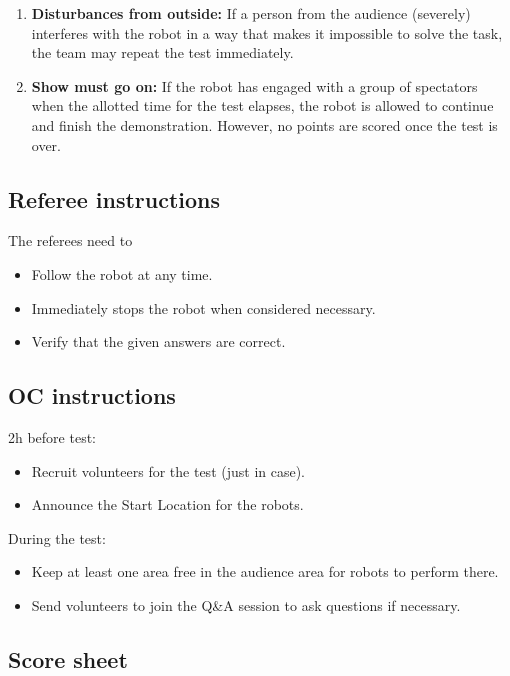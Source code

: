 \begin{enumerate}
	\item \textbf{Disturbances from outside:} If a person from the audience (severely) interferes with the robot in a way that makes it impossible to solve the task, the team may repeat the test immediately.\\

	\item \textbf{Show must go on:} If the robot has engaged with a group of spectators when the allotted time for the test elapses, the robot is allowed to continue and finish the demonstration. However, no points are scored once the test is over.
\end{enumerate}

\subsection{Referee instructions}

The referees need to
\begin{itemize}
	\item Follow the robot at any time.
	\item Immediately stops the robot when considered necessary.
	\item Verify that the given answers are correct.
\end{itemize}

\subsection{OC instructions}

2h before test:
\begin{itemize}
	\item Recruit volunteers for the test (just in case).
	\item Announce the Start Location for the robots.
\end{itemize}

During the test:
\begin{itemize}
	\item Keep at least one area free in the audience area for robots to perform there.
	\item Send volunteers to join the Q\&A session to ask questions if necessary.
\end{itemize}

\newpage
\subsection{Score sheet}
